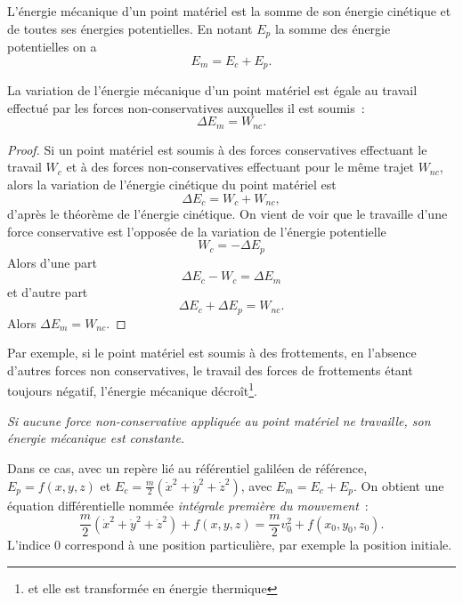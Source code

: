 \begin{defdef}
  L'énergie mécanique d'un point matériel est la somme de son énergie cinétique et de toutes ses énergies potentielles. En notant $E_p$ la somme des énergie potentielles on a
  \begin{equation}
    E_m = E_c + E_p.
  \end{equation}
\end{defdef}

\begin{theo}
  La variation de l'énergie mécanique d'un point matériel est égale au travail effectué par les forces non-conservatives auxquelles il est soumis~:
  \begin{equation}
    \Delta E_m = W_{nc}.
  \end{equation}
\end{theo}
\begin{proof}
 Si un point matériel est soumis à des forces conservatives effectuant le travail $W_c$ et à des forces non-conservatives effectuant pour le même trajet $W_{nc}$, alors la variation de l'énergie cinétique du point matériel est 
 \begin{equation}
   \Delta E_c = W_c +W_{nc},
 \end{equation}
d'après le théorème de l'énergie cinétique. On vient de voir que le travaille d'une force conservative est l'opposée de la variation de l'énergie potentielle
\begin{equation}
  W_c = - \Delta E_p
\end{equation}
Alors d'une part
\begin{equation}
  \Delta E_c -W_c = \Delta E_m
\end{equation}
et d'autre part
\begin{equation}
  \Delta E_c + \Delta E_p = W_{nc}.
\end{equation}
Alors $\Delta E_m = W_{nc}$.
\end{proof}

Par exemple, si le point matériel est soumis à des frottements, en l'absence d'autres forces non conservatives, le travail des forces de frottements étant toujours négatif, l'énergie mécanique décroît\footnote{et elle est transformée en énergie thermique}.

\emph{Si aucune force non-conservative appliquée au point matériel ne travaille, son énergie mécanique est constante.}

Dans ce cas, avec un repère lié au référentiel galiléen de référence, $E_p=f(x,y,z)$ et $E_c = \frac{m}{2}(\dot{x}^2+\dot{y}^2+\dot{z}^2)$, avec $E_m=E_c+E_p$. On obtient une équation différentielle nommée \emph{intégrale première du mouvement}~:
\begin{equation}
  \frac{m}{2}(\dot{x}^2+\dot{y}^2+\dot{z}^2) + f(x,y,z) = \frac{m}{2}v_0^2+f(x_0,y_0,z_0).
\end{equation}
L'indice $0$ correspond à une position particulière, par exemple la position initiale.

